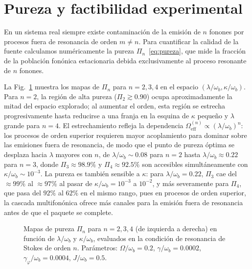 \section{Pureza y factibilidad experimental}

En un sistema real siempre existe contaminación de la emisión de $n$ fonones por procesos fuera de resonancia de orden $m \neq n$. Para cuantificar la calidad de la fuente calculamos numéricamente la pureza $\Pi_n$~\eqref{eq:pureza}, que mide la fracción de la población fonónica estacionaria debida exclusivamente al proceso resonante de $n$ fonones.

La Fig.~\ref{fig:purity_2qd_heatmap} muestra los mapas de $\Pi_n$ para $n = 2, 3, 4$ en el espacio $(\lambda/\omega_b, \kappa/\omega_b)$. Para $n=2$, la región de alta pureza ($\Pi_2 \gtrsim 0.90$) ocupa aproximadamente la mitad del espacio explorado; al aumentar el orden, esta región se estrecha progresivamente hasta reducirse a una franja en la esquina de $\kappa$ pequeño y $\lambda$ grande para $n=4$. El estrechamiento refleja la dependencia $\Omega_\mathrm{eff}^{(n)} \propto (\lambda/\omega_b)^n$: los procesos de orden superior requieren mayor acoplamiento para dominar sobre las emisiones fuera de resonancia, de modo que el punto de pureza óptima se desplaza hacia $\lambda$ mayores con $n$, de $\lambda/\omega_b \sim 0.08$ para $n=2$ hasta $\lambda/\omega_b \approx 0.22$ para $n=3$, donde $\Pi_3 \approx 98.9\%$ y $\Pi_4 \approx 92.5\%$ son accesibles simultáneamente con $\kappa/\omega_b \sim 10^{-3}$. La pureza es también sensible a $\kappa$: para $\lambda/\omega_b = 0.22$, $\Pi_3$ cae del $\approx 99\%$ al $\approx 97\%$ al pasar de $\kappa/\omega_b = 10^{-3}$ a $10^{-2}$, y más severamente para $\Pi_4$, que pasa del $92\%$ al $62\%$ en el mismo rango, pues en procesos de orden superior, la cascada multifonónica ofrece más canales para la emisión fuera de resonancia antes de que el paquete se complete.

\begin{figure}[H]
	\centering
	
	\caption{Mapas de pureza $\Pi_n$ para $n = 2, 3, 4$ (de izquierda a
		derecha) en función de $\lambda/\omega_b$ y $\kappa/\omega_b$,
		evaluados en la condición de resonancia de Stokes de orden $n$. Parámetros: $\Omega/\omega_b = 0.2$,
		$\gamma/\omega_b = 0.0002$, $\gamma_\varphi/\omega_b = 0.0004$,
		$J/\omega_b = 0.5$.}
	\label{fig:purity_2qd_heatmap}
\end{figure}

